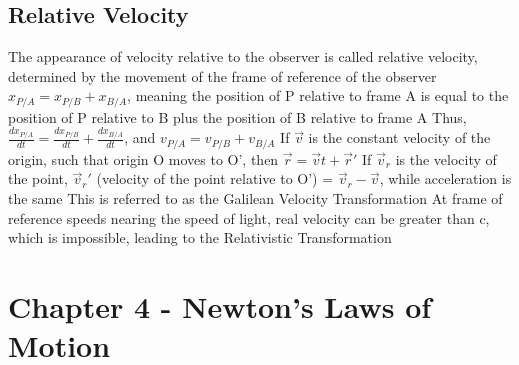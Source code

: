 \documentclass[11 pt, twoside]{article}
\newenvironment{outline*}
{
	\begin{outline}[enumerate]
	}
	{\end{outline}
}
\begin{document}
\subsection{Relative Velocity}
\begin{outline*}
\1 The appearance of velocity relative to the observer is called relative velocity, determined by the movement of the frame of reference of the observer
\2 $x_{P/A} = x_{P/B} + x_{B/A}$, meaning the position of P relative to frame A is equal to the position of P relative to B plus the position of B relative to frame A
\2 Thus, $\frac{dx_{P/A}}{dt} = \frac{dx_{P/B}}{dt} + \frac{dx_{B/A}}{dt}$, and $v_{P/A} = v_{P/B} + v_{B/A}$
\1 If  $\vec{v}$ is the constant velocity of the origin, such that origin O moves to O’, then $\vec{r} = \vec{v}t + \vec{r}'$ 
\2 If $\vec{v}_r$ is the velocity of the point, $\vec{v}_r'$ (velocity of the point relative to O’) = $\vec{v}_r - \vec{v}$, while acceleration is the same
\1 This is referred to as the Galilean Velocity Transformation
\2 At frame of reference speeds nearing the speed of light, real velocity can be greater than c, which is impossible, leading to the Relativistic Transformation
\end{outline*}
\section{Chapter 4 - Newton's Laws of Motion}
\end{document}
